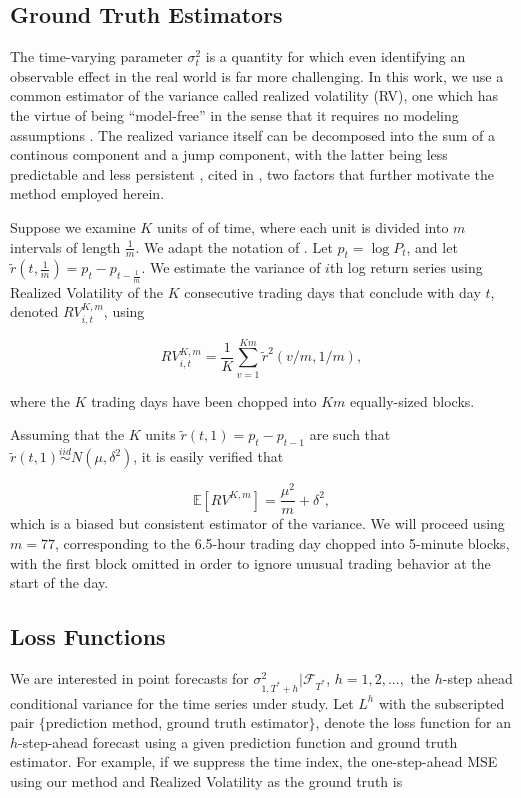 \documentclass[11pt,3p,review,authoryear]{elsarticle}
\newcommand{\simiid}{\stackrel{iid}{\sim}} %
\def\E{\mathbb{E}} %
\theoremstyle{definition}
\begin{document}
    \subsection{Ground Truth Estimators}
    \label{Ground Truth Estimators}
    
    The time-varying parameter $\sigma^{2}_{t}$ is a quantity for which even identifying an observable effect in the real world is far more challenging.  In this work, we use a common estimator of the variance called realized volatility (RV), one which has the virtue of being ``model-free'' in the sense that it requires no modeling assumptions \citep{andersen2010stochastic}.  The realized variance itself can be decomposed into the sum of a continous component and a jump component, with the latter being less predictable and less persistent \citep{andersen2007roughing}, cited in \citet{de2006forecasting}, two factors that further motivate the method employed herein.
    
    Suppose we examine $K$ units of of time, where each unit is divided into $m$ intervals of length $\frac{1}{m}$.  We adapt the notation of \citet{andersen2008realized}. Let $p_{t} = \log{P_{t}}$, and let $\tilde{r}(t,\frac{1}{m}) = p_{t} - p_{t-\frac{1}{m}}$.  We estimate the variance of $i$th log return series using Realized Volatility of the $K$ consecutive trading days that conclude with day $t$, denoted $RV_{i,t}^{K,m}$, using
    
    $$RV_{i,t}^{K,m} = \frac{1}{K}\sum^{Km}_{v=1}\tilde{r}^{2}(v/m,1/m),$$

    where the $K$ trading days have been chopped into $Km$ equally-sized blocks.

    Assuming that the $K$ units $\tilde{r}(t, 1) = p_{t} - p_{t-1}$ are such that $\tilde{r}(t, 1) \simiid N(\mu, \delta^{2})$, it is easily verified that 
    
    $$\E[RV^{K,m}] = \frac{\mu^{2}}{m} + \delta^{2},$$
    which is a biased but consistent estimator of the variance.  We will proceed using $m = 77$, corresponding to the 6.5-hour trading day chopped into 5-minute blocks, with the first block omitted in order to ignore unusual trading behavior at the start of the day.

\subsection{Loss Functions}\label{loss_function}

We are interested in point forecasts for $\sigma^{2}_{1,T^{*}+h}|\mathcal{F}_{T^{*}}$, $h=1,2,...,$ the $h$-step ahead conditional variance for the time series under study.  Let $L^{h}$ with the subscripted pair $\{$prediction method, ground truth estimator$\}$, denote the loss function for an $h$-step-ahead forecast using a given prediction function and ground truth estimator.  For example, if we suppress the time index, the one-step-ahead MSE using our method and Realized Volatility as the ground truth is
\end{document}
